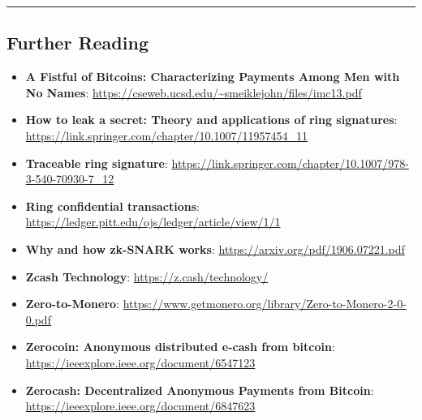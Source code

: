 \begin{center}\rule{0.5\linewidth}{0.5pt}\end{center}

\subsection{Further Reading}\label{further-reading}

\begin{itemize}
\tightlist
\item
  \textbf{A Fistful of Bitcoins: Characterizing Payments Among Men with
  No Names}: \url{https://cseweb.ucsd.edu/~smeiklejohn/files/imc13.pdf}
\item
  \textbf{How to leak a secret: Theory and applications of ring
  signatures}:
  \url{https://link.springer.com/chapter/10.1007/11957454_11}
\item
  \textbf{Traceable ring signature}:
  \url{https://link.springer.com/chapter/10.1007/978-3-540-70930-7_12}
\item
  \textbf{Ring confidential transactions}:
  \url{https://ledger.pitt.edu/ojs/ledger/article/view/1/1}
\item
  \textbf{Why and how zk-SNARK works}:
  \url{https://arxiv.org/pdf/1906.07221.pdf}
\item
  \textbf{Zcash Technology}: \url{https://z.cash/technology/}
\item
  \textbf{Zero-to-Monero}:
  \url{https://www.getmonero.org/library/Zero-to-Monero-2-0-0.pdf}
\item
  \textbf{Zerocoin: Anonymous distributed e-cash from bitcoin}:
  \url{https://ieeexplore.ieee.org/document/6547123}
\item
  \textbf{Zerocash: Decentralized Anonymous Payments from Bitcoin}:
  \url{https://ieeexplore.ieee.org/document/6847623}
\end{itemize}
